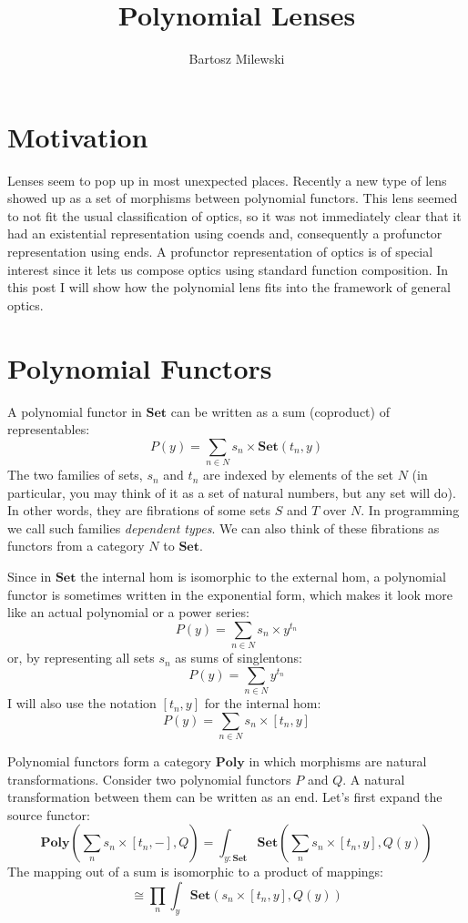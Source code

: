 \documentclass[11pt]{amsart}
\author{Bartosz Milewski}
\title{Polynomial Lenses}
\begin{document}
\maketitle{}

\section{Motivation}
Lenses seem to pop up in most unexpected places. Recently a new type of lens showed up as a set of morphisms between polynomial functors. This lens seemed to not fit the usual classification of optics, so it was not immediately clear that it had an existential representation using coends and, consequently a profunctor representation using ends. A profunctor representation of optics is of special interest since it lets us compose optics using standard function composition. In this post I will show how the polynomial lens fits into the framework of general optics.

\section{Polynomial Functors}

A polynomial functor in $\mathbf{Set}$ can be written as a sum (coproduct) of representables:
\[ P(y) = \sum_{n \in N} s_n \times \mathbf{Set}(t_n, y) \]
The two families of sets, $s_n$ and $t_n$ are indexed by elements of the set $N$ (in particular, you may think of it as a set of natural numbers, but any set will do). In other words, they are fibrations of some sets $S$ and $T$ over $N$. In programming we call such families \emph{dependent types}. We can also think of these fibrations as functors from a category $N$ to $\mathbf{Set}$. 

Since in $\mathbf{Set}$ the internal hom is isomorphic to the external hom, a polynomial functor is sometimes written in the exponential form, which makes it look more like an actual polynomial or a power series:
\[ P(y) = \sum_{n \in N} s_n \times y^{t_n} \]
or, by representing all sets $s_n$ as sums of singlentons:
\[ P(y) = \sum_{n \in N} y^{t_n} \]
I will also use the notation $[t_n, y]$ for the internal hom:
\[ P(y) = \sum_{n \in N} s_n \times [t_n, y] \]
  
Polynomial functors form a category $\mathbf{Poly}$ in which morphisms are natural transformations. Consider two polynomial functors $P$ and $Q$. A natural transformation between them can be written as an end. Let's first expand the source functor:
\[   \mathbf{Poly}\left( \sum_n s_n \times [t_n, -], Q\right)  =  \int_{y\colon \mathbf{Set}} \mathbf{Set} \left(\sum_n s_n \times [t_n, y], Q(y)\right)\]
The mapping out of a sum is isomorphic to a product of mappings:
\[ \cong \prod_n \int_y \mathbf{Set} \left(s_n \times [t_n, y], Q(y)\right) \]
\end{document}
